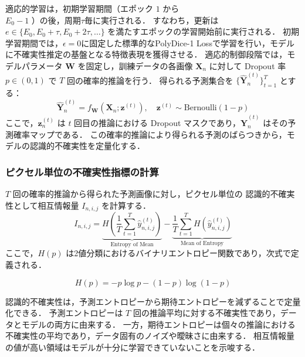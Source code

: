 \documentclass[a4paper,platex,dvipdfmx,twocolumn]{jsarticle}
\begin{document}
適応的学習は，初期学習期間（エポック $1$ から \\ $E_0 - 1$ ）の後，周期$\tau$毎に実行される．
すなわち，更新は $e \in \{E_0, E_0+\tau, E_0+2\tau, \ldots\}$ を満たすエポックの学習開始前に実行される．
初期学習期間では，$\epsilon = 0$に固定した標準的なPolyDice-1 Lossで学習を行い，モデルに不確実性推定の基盤となる特徴表現を獲得させる．
適応的制御段階では，モデルパラメータ $\mathbf{W}$ を固定し，訓練データの各画像 $\mathbf{X}_n$ に対して Dropout 率 $p \in (0,1)$ で $T$ 回の確率的推論を行う．
得られる予測集合を $\{\hat{\mathbf{Y}}_n^{(t)}\}_{t=1}^{T}$ とする：
%
\begin{equation}
    \hat{\mathbf{Y}}_n ^{(t)} = f_{\mathbf{W}}(\mathbf{X}_n; \mathbf{z}^{(t)}), \quad \mathbf{z}^{(t)} \sim \text{Bernoulli}(1-p)
\end{equation}
%
ここで，$\mathbf{z}_ n ^{(t)}$ は $t$ 回目の推論における Dropout マスクであり，$\hat{\mathbf{Y}}_n^{(t)}$ はその予測確率マップである．
この確率的推論により得られる予測のばらつきから，モデルの認識的不確実性を定量化する．

\subsubsection{ピクセル単位の不確実性指標の計算}
$T$ 回の確率的推論から得られた予測画像に対し，ピクセル単位の
認識的不確実性として相互情報量 $I_{n, i, j}$ を計算する．
\begin{equation}
    I_{n, i,j} = \underbrace{H\left( \frac{1}{T} \sum_{t=1}^{T} \hat{y}_{n, i,j}^{(t)} \right)}_{\text{Entropy of Mean}} - \underbrace{\frac{1}{T} \sum_{t=1}^{T} H\left( \hat{y}_{n, i,j}^{(t)} \right)}_{\text{Mean of Entropy}}
\end{equation}
ここで，$H(p)$ は2値分類におけるバイナリエントロピー関数であり，次式で定義される．

\begin{equation}
    H(p) = -p \log p - (1-p) \log (1-p)
\end{equation}

認識的不確実性は，予測エントロピーから期待エントロピーを減ずることで定量化できる．
予測エントロピーは $T$ 回の推論平均に対する不確実性であり，データとモデルの両方に由来する．
一方，期待エントロピーは個々の推論における不確実性の平均であり，データ固有のノイズや曖昧さに由来する．
相互情報量の値が高い領域はモデルが十分に学習できていないことを示唆する．
\end{document}
